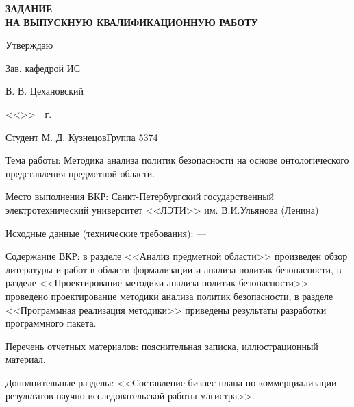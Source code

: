 \documentclass[../main]{subfiles}
\begin{document}
\newpage

\begin{titlepage}
    \centering
        
    \MakeUppercase{\bfseries\large
        задание\\
        на выпускную квалификационную работу
    }

    \vspace{2mm}

    \hfill Утверждаю

    \hfill Зав. кафедрой ИС

    \hfill {} В. В. Цехановский 

    \hfill <<\underline{\hspace{1.2cm}}>>\underline{\hspace{5cm}}~\the\year~г.

    \vspace{2mm}

    \parbox[t]{\textwidth}{
        Студент М. Д. Кузнецов\hfill Группа 5374

        Тема работы: Методика анализа политик безопасности на основе онтологического представления предметной области.

        Место выполнения ВКР: Санкт-Петербургский государственный электротехнический университет 
        <<ЛЭТИ>> им. В.И.Ульянова (Ленина)
        
        Исходные данные (технические требования): ---

        Содержание ВКР: в разделе <<Анализ предметной области>> произведен обзор литературы и работ в области формализации и анализа политик безопасности, в разделе <<Проектирование методики анализа политик безопасности>> проведено проектирование методики анализа политик безопасности, в разделе <<Программная реализация методики>> приведены результаты разработки программного пакета.


        Перечень отчетных материалов: пояснительная записка, иллюстрационный материал.

        Дополнительные разделы: <<Cоставление бизнес-плана по коммерциализации результатов научно-исследовательской работы магистра>>.
    }


\end{titlepage}
\end{document}
